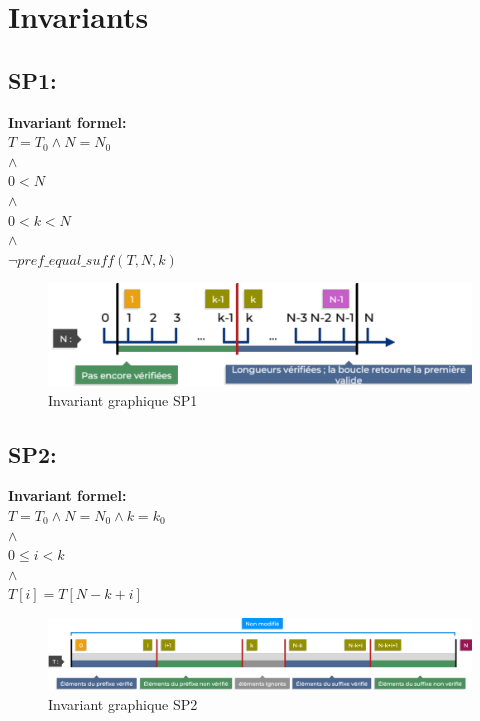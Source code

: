\section{Invariants}\label{invariants}

\subsection{SP1:}
\textbf{Invariant formel:} \\
    $ T = T_0 \land N = N_0$ \\
    $ \land$ \\
    $ 0 < N $ \\
    $ \land$ \\
    $ 0 < k < N $ \\
    $ \land $ \\
    $ \neg pref\_equal\_suff(T, N, k) $

\begin{figure}[h]
    \centering
    \includegraphics[width=1\textwidth]{invariant-1.pdf}
    \caption{Invariant graphique SP1}
\end{figure}

\subsection{SP2:}
\textbf{Invariant formel:} \\
    $ T = T_0 \land N = N_0 \land k = k_0$ \\
    $\land$ \\
    $0 \leq i < k$ \\
    $\land$ \\
    $T[i] = T[N - k + i]$ \\

\begin{figure}[h]
    \centering
    \includegraphics[width=1\textwidth]{invariant-2.pdf}
    \caption{Invariant graphique SP2}
\end{figure}

